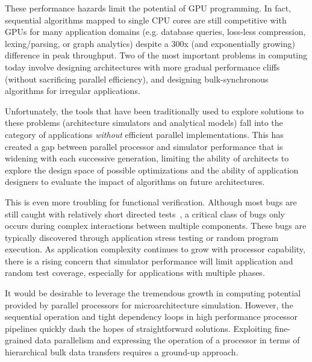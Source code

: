 \documentclass[conference, 10pt]{IEEEtran}
\begin{document}
These performance hazards limit the potential of GPU programming. In fact,
sequential algorithms mapped to single CPU cores are still competitive with GPUs
for many application domains (e.g. database queries, loss-less compression,
lexing/parsing, or graph analytics) despite a 300x (and exponentially growing)
difference in peak throughput.  Two of the most important problems in computing
today involve designing architectures with more gradual performance cliffs
(without sacrificing parallel efficiency), and
designing bulk-synchronous algorithms for irregular applications.  

Unfortunately, the tools that have been traditionally used to explore solutions
to these problems (architecture simulators and analytical models) fall into the
category of applications \textit{without} efficient parallel implementations. 
This has created a gap between parallel processor and simulator performance that
is widening with each successive generation, limiting the ability of architects
to explore the design space of possible optimizations and the ability of
application designers to evaluate the impact of algorithms on future
architectures.  

This is even more troubling for functional verification.  Although most bugs are
still caught with relatively short directed tests~\cite{ref:bug-distributions},
a critical class of bugs only occurs during complex interactions between
multiple components.  These bugs are typically discovered through application
stress testing or random program execution.   As application complexity
continues to grow with processor capability, there is a rising concern that
simulator performance will limit application and random test coverage,
especially for applications with multiple phases.  

It would be desirable to leverage the tremendous growth in computing potential
provided by parallel processors for microarchitecture simulation.  However,
the sequential operation and tight dependency loops in high performance 
processor pipelines quickly dash the hopes of straightforward solutions.
Exploiting fine-grained data parallelism and expressing the operation of a
processor in terms of hierarchical bulk data transfers requires a ground-up
approach.
\end{document}
